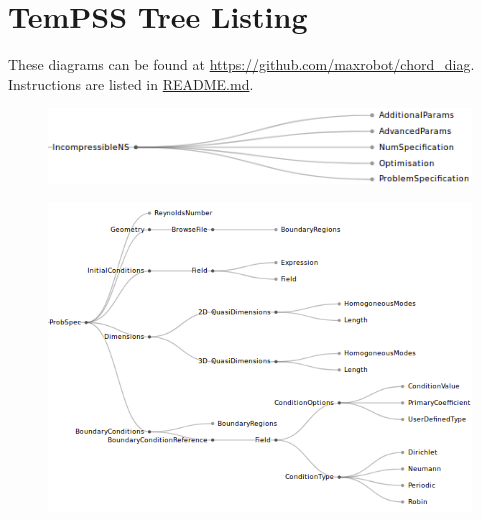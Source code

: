 \documentclass[11pt, a4paper]{report}
\begin{document}
\newpage
\appendix
\chapter{TemPSS Tree Listing}
\label{app:tree_listing}
\vspace*{-1cm}
These diagrams can be found at \url{https://github.com/maxrobot/chord_diag}. Instructions are listed in \url{README.md}.

\begin{figure}[htb!]
 \centering
 \includegraphics[width=.8\linewidth,  clip=true, trim = .1cm 0cm 0cm 0cm]{overview}
 \label{fig:overview}
\end{figure}

\begin{figure}[htb!]
 \centering
 \includegraphics[width=1\linewidth,  clip=true, trim = 0cm 0cm 0cm 0cm]{problemSpecification}
 \label{fig:problemSpecification}
\end{figure}
\end{document}
